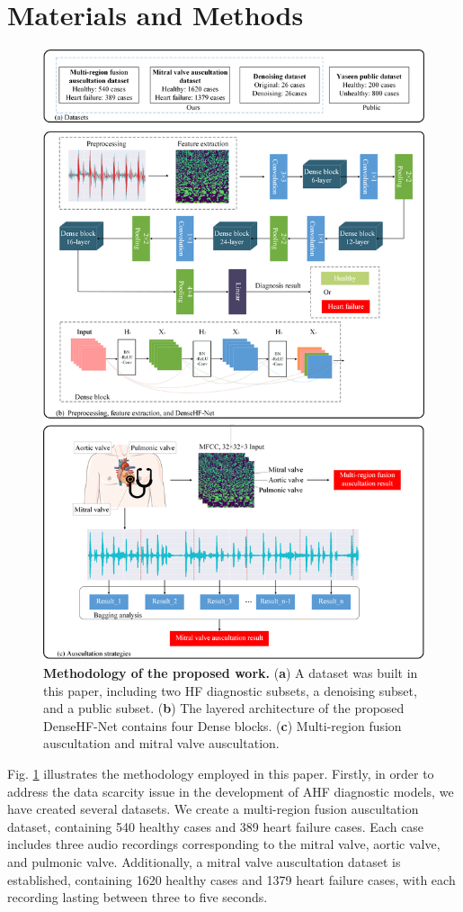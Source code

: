 \section{Materials and Methods}\label{Materials and Methods}
\begin{figure}[htbp]
    \centering
    \includegraphics[width=0.77\linewidth]{figs/methods/all.png}
    \caption{\textbf{Methodology of the proposed work.} (\textbf{a}) A dataset was built in this paper, including two HF diagnostic subsets, a denoising subset, and a public subset. (\textbf{b}) The layered architecture of the proposed DenseHF-Net contains four Dense blocks. (\textbf{c}) Multi-region fusion auscultation and mitral valve auscultation.}
	\label{FIG:Methodology}
\end{figure}
Fig. \ref{FIG:Methodology} illustrates the methodology employed in this paper. Firstly, in order to address the data scarcity issue in the development of AHF diagnostic models, we have created several datasets. We create a multi-region fusion auscultation dataset, containing 540 healthy cases and 389 heart failure cases. Each case includes three audio recordings corresponding to the mitral valve, aortic valve, and pulmonic valve. Additionally, a mitral valve auscultation dataset is established, containing 1620 healthy cases and 1379 heart failure cases, with each recording lasting between three to five seconds.

